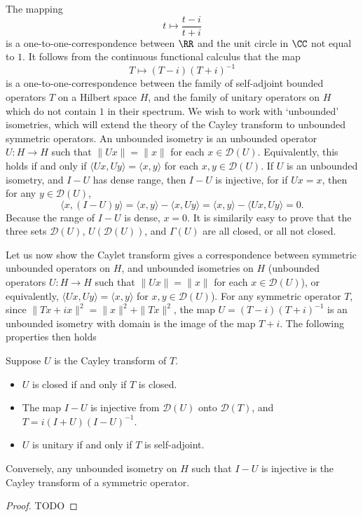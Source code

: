 The mapping
%
\[ t \mapsto \frac{t - i}{t + i} \]
%
is a one-to-one-correspondence between $\RR$ and the unit circle in $\CC$ not equal to $1$. It follows from the continuous functional calculus that the map
%
\[ T \mapsto (T - i)(T + i)^{-1} \]
%
is a one-to-one-correspondence between the family of self-adjoint bounded operators $T$ on a Hilbert space $H$, and the family of unitary operators on $H$ which do not contain $1$ in their spectrum. We wish to work with `unbounded' isometries, which will extend the theory of the Cayley transform to unbounded symmetric operators. An unbounded isometry is an unbounded operator $U: H \to H$ such that $\| Ux \| = \| x \|$ for each $x \in \mathcal{D}(U)$. Equivalently, this holds if and only if $\langle Ux, Uy \rangle = \langle x, y \rangle$ for each $x,y \in \mathcal{D}(U)$. If $U$ is an unbounded isometry, and $I - U$ has dense range, then $I - U$ is injective, for if $Ux = x$, then for any $y \in \mathcal{D}(U)$,
%
\[ \langle x, (I - U)y \rangle = \langle x, y \rangle - \langle x, Uy \rangle = \langle x,y \rangle - \langle Ux, Uy \rangle = 0. \]
%
Because the range of $I - U$ is dense, $x = 0$. It is similarily easy to prove that the three sets $\mathcal{D}(U)$, $U(\mathcal{D}(U))$, and $\Gamma(U)$ are all closed, or all not closed.

Let us now show the Caylet transform gives a correspondence between symmetric unbounded operators on $H$, and unbounded isometries on $H$ (unbounded operators $U: H \to H$ such that $\| Ux \| = \| x \|$ for each $x \in \mathcal{D}(U)$), or equivalently, $\langle Ux, Uy \rangle = \langle x, y \rangle$ for $x,y \in \mathcal{D}(U)$). For any symmetric operator $T$, since $\| Tx + ix \|^2 = \| x \|^2 + \| Tx \|^2$, the map $U = (T - i)(T + i)^{-1}$ is an unbounded isometry with domain is the image of the map $T + i$. The following properties then holds

\begin{theorem}
    Suppose $U$ is the Cayley transform of $T$.
    \begin{itemize}
        \item $U$ is closed if and only if $T$ is closed.
        \item The map $I - U$ is injective from $\mathcal{D}(U)$ onto $\mathcal{D}(T)$, and $T = i(I + U)(I - U)^{-1}$.
        \item $U$ is unitary if and only if $T$ is self-adjoint.
    \end{itemize}
    Conversely, any unbounded isometry on $H$ such that $I - U$ is injective is the Cayley transform of a symmetric operator.
\end{theorem}
\begin{proof}
    TODO
\end{proof}

